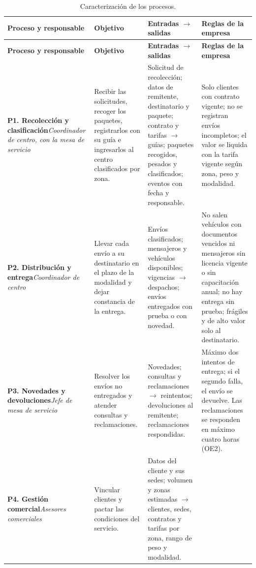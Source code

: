 {\singlespacing\small
\begin{longtable}{L{2.6cm} L{3.3cm} L{4.2cm} L{4.3cm}}
\caption{Caracterización de los procesos.}
\label{tab:caracterizacion}\\
\toprule
\textbf{Proceso y responsable} & \textbf{Objetivo} & \textbf{Entradas $\rightarrow$ salidas} & \textbf{Reglas de la empresa} \\
\midrule
\endfirsthead
\toprule
\textbf{Proceso y responsable} & \textbf{Objetivo} & \textbf{Entradas $\rightarrow$ salidas} & \textbf{Reglas de la empresa} \\
\midrule
\endhead
\bottomrule
\endfoot
\textbf{P1. Recolección y clasificación}\newline\textit{Coordinador de centro, con la mesa de servicio} &
Recibir las solicitudes, recoger los paquetes, registrarlos con su guía e ingresarlos al centro clasificados por zona. &
Solicitud de recolección; datos de remitente, destinatario y paquete; contrato y tarifas $\rightarrow$ guías; paquetes recogidos, pesados y clasificados; eventos con fecha y responsable. &
Solo clientes con contrato vigente; no se registran envíos incompletos; el valor se liquida con la tarifa vigente según zona, peso y modalidad. \\
\midrule
\textbf{P2. Distribución y entrega}\newline\textit{Coordinador de centro} &
Llevar cada envío a su destinatario en el plazo de la modalidad y dejar constancia de la entrega. &
Envíos clasificados; mensajeros y vehículos disponibles; vigencias $\rightarrow$ despachos; envíos entregados con prueba o con novedad. &
No salen vehículos con documentos vencidos ni mensajeros sin licencia vigente o sin capacitación anual; no hay entrega sin prueba; frágiles y de alto valor solo al destinatario. \\
\midrule
\textbf{P3. Novedades y devoluciones}\newline\textit{Jefe de mesa de servicio} &
Resolver los envíos no entregados y atender consultas y reclamaciones. &
Novedades; consultas y reclamaciones $\rightarrow$ reintentos; devoluciones al remitente; reclamaciones respondidas. &
Máximo dos intentos de entrega; si el segundo falla, el envío se devuelve. Las reclamaciones se responden en máximo cuatro horas (OE2). \\
\midrule
\textbf{P4. Gestión comercial}\newline\textit{Asesores comerciales} &
Vincular clientes y pactar las condiciones del servicio. &
Datos del cliente y sus sedes; volumen y zonas estimadas $\rightarrow$ clientes, sedes, contratos y tarifas por zona, rango de peso y modalidad. &

\end{longtable}}
